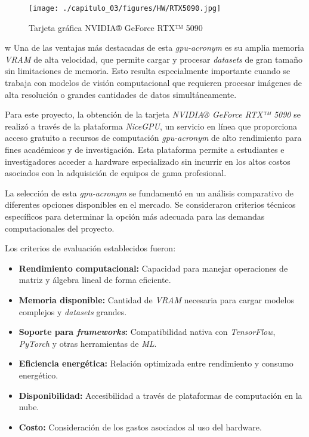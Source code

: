\begin{figure}[H]
\leavevmode
\begin{minipage}{\textwidth}
\begin{center}
\texttt{[image: ./capitulo\_03/figures/HW/RTX5090.jpg]}
\caption{Tarjeta gráfica NVIDIA® GeForce RTX™ 5090\label{fig:rtx5090}}
\end{center}
\end{minipage}
\end{figure}
w
Una de las ventajas más destacadas de esta \textit{\acrshort{gpu-acronym}} es su amplia memoria \textit{VRAM} de alta velocidad, que permite cargar y procesar \textit{datasets} de gran tamaño sin limitaciones de memoria. Esto resulta especialmente importante cuando se trabaja con modelos de visión computacional que requieren procesar imágenes de alta resolución o grandes cantidades de datos simultáneamente.

Para este proyecto, la obtención de la tarjeta \textit{NVIDIA® GeForce RTX™ 5090} se realizó a través de la plataforma \textit{NiceGPU}, un servicio en línea que proporciona acceso gratuito a recursos de computación \textit{\acrshort{gpu-acronym}} de alto rendimiento para fines académicos y de investigación. Esta plataforma permite a estudiantes e investigadores acceder a hardware especializado sin incurrir en los altos costos asociados con la adquisición de equipos de gama profesional.

La selección de esta \textit{\acrshort{gpu-acronym}} se fundamentó en un análisis comparativo de diferentes opciones disponibles en el mercado. Se consideraron criterios técnicos específicos para determinar la opción más adecuada para las demandas computacionales del proyecto.

Los criterios de evaluación establecidos fueron:

\begin{itemize}
    \item \textbf{Rendimiento computacional:} Capacidad para manejar operaciones de matriz y álgebra lineal de forma eficiente.
    \item \textbf{Memoria disponible:} Cantidad de \textit{VRAM} necesaria para cargar modelos complejos y \textit{datasets} grandes.
    \item \textbf{Soporte para \textit{frameworks}:} Compatibilidad nativa con \textit{TensorFlow}, \textit{PyTorch} y otras herramientas de \textit{ML}.
    \item \textbf{Eficiencia energética:} Relación optimizada entre rendimiento y consumo energético.
    \item \textbf{Disponibilidad:} Accesibilidad a través de plataformas de computación en la nube.
    \item \textbf{Costo:} Consideración de los gastos asociados al uso del hardware.
\end{itemize}

